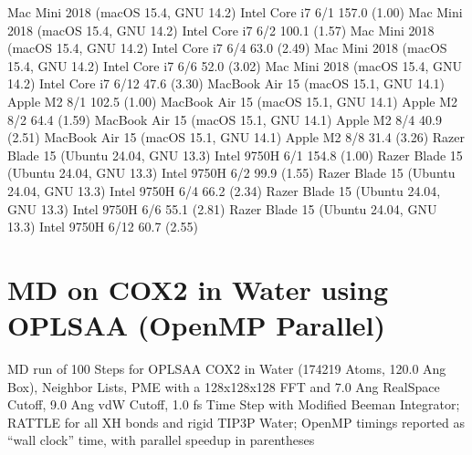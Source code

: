 \documentclass[letterpaper,11pt,english]{sphinxmanual}
\begin{document}
\begin{sphinxVerbatim}[commandchars=\\\{\}]
Mac Mini 2018 (macOS 15.4, GNU 14.2)      Intel Core i7       6/1       157.0 (1.00)
Mac Mini 2018 (macOS 15.4, GNU 14.2)      Intel Core i7       6/2       100.1 (1.57)
Mac Mini 2018 (macOS 15.4, GNU 14.2)      Intel Core i7       6/4        63.0 (2.49)
Mac Mini 2018 (macOS 15.4, GNU 14.2)      Intel Core i7       6/6        52.0 (3.02)
Mac Mini 2018 (macOS 15.4, GNU 14.2)      Intel Core i7      6/12        47.6 (3.30)
MacBook Air 15 (macOS 15.1, GNU 14.1)        Apple M2         8/1       102.5 (1.00)
MacBook Air 15 (macOS 15.1, GNU 14.1)        Apple M2         8/2        64.4 (1.59)
MacBook Air 15 (macOS 15.1, GNU 14.1)        Apple M2         8/4        40.9 (2.51)
MacBook Air 15 (macOS 15.1, GNU 14.1)        Apple M2         8/8        31.4 (3.26)
Razer Blade 15 (Ubuntu 24.04, GNU 13.3)    Intel 9750H        6/1       154.8 (1.00)
Razer Blade 15 (Ubuntu 24.04, GNU 13.3)    Intel 9750H        6/2        99.9 (1.55)
Razer Blade 15 (Ubuntu 24.04, GNU 13.3)    Intel 9750H        6/4        66.2 (2.34)
Razer Blade 15 (Ubuntu 24.04, GNU 13.3)    Intel 9750H        6/6        55.1 (2.81)
Razer Blade 15 (Ubuntu 24.04, GNU 13.3)    Intel 9750H       6/12        60.7 (2.55)
\end{sphinxVerbatim}


\section{MD on COX\sphinxhyphen{}2 in Water using OPLS\sphinxhyphen{}AA (OpenMP Parallel)}
\label{\detokenize{text/benchmarks:md-on-cox-2-in-water-using-opls-aa-openmp-parallel}}
\sphinxAtStartPar
MD run of 100 Steps for OPLS\sphinxhyphen{}AA COX\sphinxhyphen{}2 in Water (174219 Atoms, 120.0 Ang Box), Neighbor Lists, PME with a 128x128x128 FFT and 7.0 Ang Real\sphinxhyphen{}Space Cutoff, 9.0 Ang vdW Cutoff, 1.0 fs Time Step with Modified Beeman Integrator; RATTLE for all X\sphinxhyphen{}H bonds and rigid TIP3P Water; OpenMP timings reported as “wall clock” time, with parallel speedup in parentheses

\sphinxAtStartPar
{}
\end{document}
